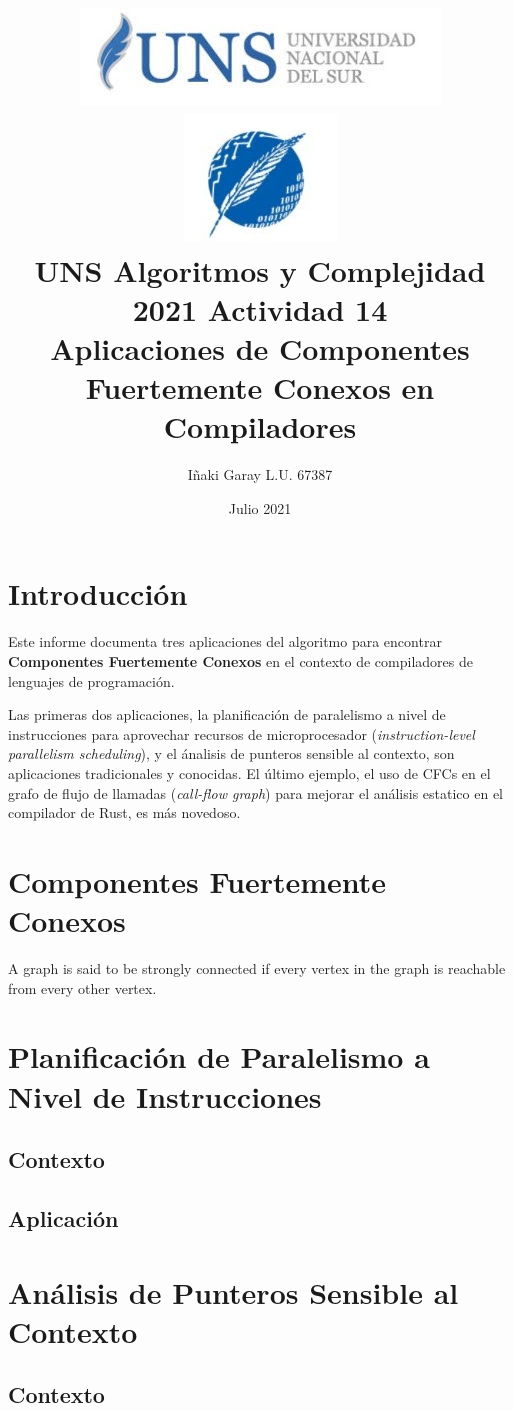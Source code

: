 \documentclass[12pt, a4paper]{article}
\title{
    \includegraphics[height=0.2\textwidth]{uns-logo}
    \includegraphics[height=0.2\textwidth]{dcic-logo} \\
    UNS Algoritmos y Complejidad 2021 Actividad 14 \\
    \large{Aplicaciones de Componentes Fuertemente Conexos en Compiladores}
    }
\author{Iñaki Garay L.U. 67387}
\date{Julio 2021}
\begin{document}
\maketitle


\section{Introducción}
Este informe documenta tres aplicaciones del algoritmo para encontrar \textbf{Componentes Fuertemente Conexos} en el contexto de compiladores de lenguajes de programación.

Las primeras dos aplicaciones, la planificación de paralelismo a nivel de instrucciones para aprovechar recursos de microprocesador (\textit{instruction-level parallelism scheduling}), y el ánalisis de punteros sensible al contexto, son aplicaciones tradicionales y conocidas. 
El último ejemplo, el uso de CFCs en el grafo de flujo de llamadas (\textit{call-flow graph}) para mejorar el análisis estatico en el compilador de Rust, es más novedoso.

\section{Componentes Fuertemente Conexos}

A graph is said to be strongly connected if every vertex in the graph is reachable from every other vertex.

\section{Planificación de Paralelismo a Nivel de Instrucciones}

\subsection{Contexto}

\subsection{Aplicación}

\section{Análisis de Punteros Sensible al Contexto}

\subsection{Contexto}
\end{document}
